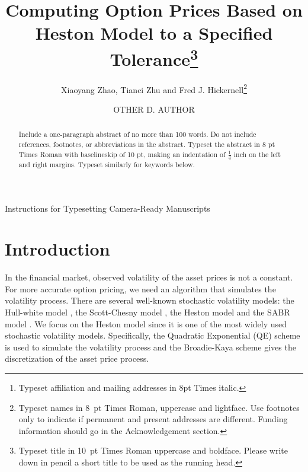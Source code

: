 \documentclass{ws-ijfe}
\begin{document}
{Instructions for Typesetting Camera-Ready Manuscripts}

\catchline{}{}{}{}{}

\title{Computing Option Prices Based on Heston Model to a Specified Tolerance\footnote{Typeset title in
10~pt Times Roman uppercase and boldface. Please write
down in pencil a short title to be used as the running head.}}

\author{Xiaoyang Zhao, Tianci Zhu and Fred J. Hickernell\footnote{Typeset names in 8~pt Times Roman, uppercase and lightface.  Use footnotes only to indicate if permanent and present addresses are different. Funding information should go in the Acknowledgement section.}}

\address{Full affiliations\footnote{Typeset
affiliation and mailing addresses in 8pt Times italic.} \\
,mailing addresses and telephone number}

\author{OTHER D. AUTHOR}

\address{Full affiliations \\
,mailing addresses and telephone number}

\maketitle

\begin{abstract}
Include a one-paragraph abstract of no more than 100 words. Do not include references, footnotes, or abbreviations in the abstract. Typeset the
abstract in 8 pt Times Roman with baselineskip of 10 pt, making
an indentation of $\frac14$ inch on the left and right margins.
Typeset similarly for keywords below.
\end{abstract}


\section{Introduction}

In the financial market, observed volatility of the asset prices is not a constant. For more accurate option pricing, we need an algorithm that simulates the volatility process. There are several well-known stochastic volatility models: the Hull-white model \cite{HullWhite1987}, the Scott-Chesny model \cite{ScottChesney1989}, the Heston model \cite{Heston1993} and the SABR model \cite{SABR2002}. We focus on the Heston model since it is one of the most widely used stochastic volatility models. Specifically, the Quadratic Exponential (QE) scheme is used to simulate the volatility process and the Broadie-Kaya scheme gives the discretization of the asset price process.
\end{document}
